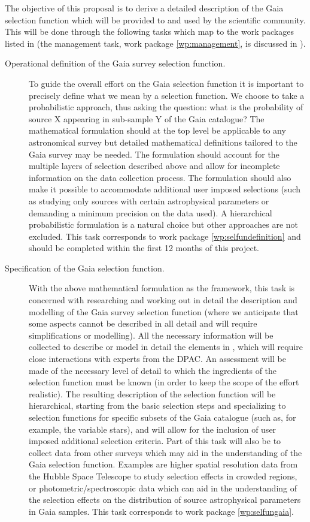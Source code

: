 The objective of this proposal is to derive a detailed description of the Gaia selection function which will be provided to and used by the scientific community. This will be done through the following tasks which map to the work packages listed in  (the management task, work package \ref{wp:management}, is discussed in ).

\begin{description}
    \item[Operational definition of the Gaia survey selection function.] To guide the overall effort on the Gaia selection function it is important to precisely define what we mean by a selection function. We choose to take a probabilistic approach, thus asking the question: what is the probability of source X appearing in sub-sample Y of the Gaia catalogue? The mathematical formulation should at the top level be applicable to any astronomical survey but detailed mathematical definitions tailored to the Gaia survey may be needed. The formulation should account for the multiple layers of selection described above and allow for incomplete information on the data collection process. The formulation should also make it possible to accommodate additional user imposed selections (such as studying only sources with certain astrophysical parameters or demanding a minimum precision on the data used). A hierarchical probabilistic formulation is a natural choice but other approaches are not excluded. This task corresponds to work package \ref{wp:selfundefinition} and should be completed within the first 12 months of this project.
    \item[Specification of the Gaia selection function.] With the above mathematical formulation as the framework, this task is concerned with researching and working out in detail the description and modelling of the Gaia survey selection function (where we anticipate that some aspects cannot be described in all detail and will require simplifications or modelling). All the necessary information will be collected to describe or model in detail the elements in , which will require close interactions with experts from the DPAC. An assessment will be made of the necessary level of detail to which the ingredients of the selection function must be known (in order to keep the scope of the effort realistic). The resulting description of the selection function will be hierarchical, starting from the basic selection steps and specializing to selection functions for specific subsets of the Gaia catalogue (such as, for example, the variable stars), and will allow for the inclusion of user imposed additional selection criteria. Part of this task will also be to collect data from other surveys which may aid in the understanding of the Gaia selection function. Examples are higher spatial resolution data from the Hubble Space Telescope to study selection effects in crowded regions, or photometric/spectroscopic data which can aid in the understanding of the selection effects on the distribution of source astrophysical parameters in Gaia samples. This task corresponds to work package \ref{wp:selfungaia}.

\end{description}

